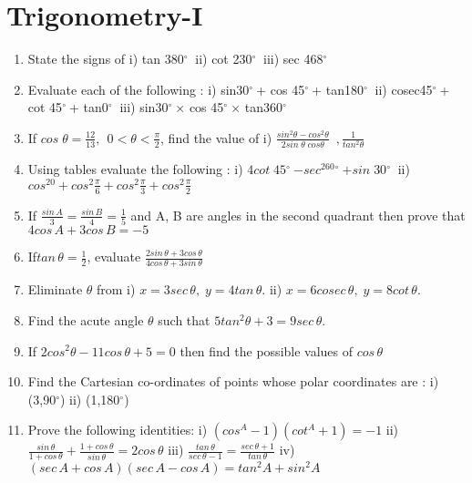 \documentclass[14pt]{article}
\newcommand{\degree}{$^{\circ}\ $} %
\begin{document}
\begin{multicols}{2}
\begin{enumerate}
\end{enumerate} 


\section{Trigonometry-I}
\noindent
\begin{enumerate}[resume]

\item State the signs of
i) tan 380\degree
ii) cot 230\degree
iii) sec 468\degree

\item Evaluate each of the following :
i) sin30\degree + cos 45\degree + tan180\degree
ii) cosec45\degree + cot 45\degree + tan0\degree
iii) sin30\degree × cos 45\degree × tan360\degree

\item If $cos\;\theta = \frac{12}{13},\ \ 0<\theta<\frac{\pi}{2}$, find the value of i) $\frac{sin^2\theta-cos^2\theta}{2sin\;\theta\;cos\theta}\; \ , \frac{1}{tan^2\theta}$

\item Using tables evaluate the following : i) $4cot\;45$\degree $-sec^260$\degree $ + sin\;30$\degree 
ii) $cos^20+cos^2\frac{\pi}{6}+cos^2\frac{\pi}{3}+cos^2\frac{\pi}{2}$

\item If $\frac{sin\,A}{3}=\frac{sin\,B}{4}=\frac{1}{5} $ and A, B are angles in the second quadrant then prove that $4cos\,A+3cos\,B=-5$

\item If$tan\,\theta=\frac{1}{2}$, evaluate $\frac{2sin\,\theta+3cos\,\theta}{4cos\,\theta+3sin\,\theta}$

\item Eliminate $\theta$ from i) $x=3sec\,\theta,\;y=4tan\,\theta.$ ii) $x=6cosec\,\theta,\;y=8cot\,\theta.$

\item Find the acute angle $\theta$ such that $5tan^2\theta+3=9sec\,\theta.$

\item If $2cos^2\theta - 11cos\,\theta+5=0$ then find the possible values of $cos\,\theta$

\item Find the Cartesian co-ordinates of points
whose polar coordinates are : i) (3,90$^{\circ}$) ii) (1,180$^{\circ}$)

\item Prove the following identities: i) $(cos^A-1)(cot^A+1)=-1$ ii) $\frac{sin\,\theta}{1+cos\,\theta}+\frac{1+cos\,\theta}{sin\,\theta}=2cos\,\theta$ iii) $\frac{tan\,\theta}{sec\,\theta-1}=\frac{sec\,\theta+1}{tan\,\theta}$ iv) $(sec\,A+cos\,A)(sec\,A-cos\,A)=tan^2A+sin^2A$


\end{enumerate}
\end{multicols}
\end{document}

